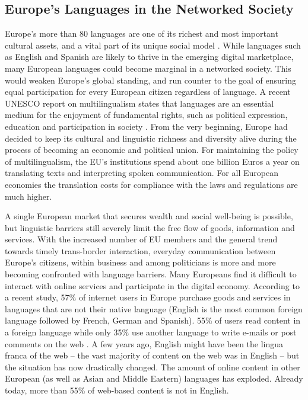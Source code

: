 \documentclass[10pt, plain]{../../metanetpaper}
\begin{document}
\begin{multicols}{2}

\subsection{Europe's Languages in the Networked Society}
\label{sec:status-europes-languages}

Europe’s more than 80 languages are one of its richest and most important cultural assets, and a vital part of its unique social model \cite{EC2}. While languages such as English and Spanish are likely to thrive in the emerging digital marketplace, many European languages could become marginal in a networked society. This would weaken Europe’s global standing, and run counter to the goal of ensuring equal participation for every European citizen regardless of language. A recent UNESCO report on multilingualism states that languages are an essential medium for the enjoyment of fundamental rights, such as political expression, education and participation in society \cite{Unesco1}. From the very beginning, Europe had decided to keep its cultural and linguistic richness and diversity alive during the process of becoming an economic and political union. For maintaining the policy of multilingualism, the EU’s institutions spend about one billion Euros a year on translating texts and interpreting spoken communication. For all European economies the translation costs for compliance with the laws and regulations are much higher.

A single European market that secures wealth and social well-being is possible, but linguistic barriers still severely limit the free flow of goods, information and services. With the increased number of EU members and the general trend towards timely trans-border interaction, everyday communication between Europe’s citizens, within business and among politicians is more and more becoming confronted with language barriers. Many Europeans find it difficult to interact with online services and participate in the digital economy. According to a recent study, 57\% of internet users in Europe purchase goods and services in languages that are not their native language (English is the most common foreign language followed by French, German and Spanish). 55\% of users read content in a foreign language while only 35\% use another language to write e-mails or post comments on the web \cite{EC1}. A few years ago, English might have been the lingua franca of the web -- the vast majority of content on the web was in English -- but the situation has now drastically changed. The amount of online content in other European (as well as Asian and Middle Eastern) languages has exploded. Already today, more than 55\% of web-based content is not in English.


\end{multicols}
\end{document}
